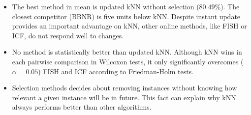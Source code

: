 \documentclass[preprint,12pt]{elsarticle}
\begin{document}
\begin{itemize}
	\item The best method in mean is updated kNN without selection ($80.49\%$). The closest competitor (BBNR) is five units below kNN. Despite instant update provides an important advantage on kNN, other online methods, like FISH or ICF, do not respond well to changes.
	\item No method is statistically better than updated kNN. Although kNN wins in each pairwise comparison in Wilcoxon tests, it only significantly overcomes ($\alpha = 0.05$) FISH and ICF according to Friedman-Holm tests.
	\item Selection methods decides about removing instances without knowing how relevant a given instance will be in future. This fact can explain why kNN always performs better than other algorithms. %
\end{itemize}
\end{document}
